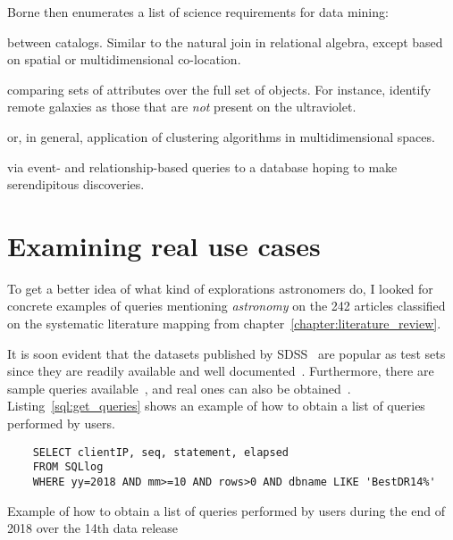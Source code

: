 Borne then enumerates a list of science requirements for data mining:

\begin{description}[leftmargin=1cm, labelindent=0.5cm]
    \item[Object Cross-Identification] between catalogs. Similar to the natural join
        in relational algebra, except based on spatial or multidimensional co-location.
    \item[Object Cross-Correlation] comparing sets of attributes over the full set of objects.
        For instance, identify remote galaxies as those that are \emph{not} present on the ultraviolet.
    \item[Nearest-neighbor identification] or, in general, application of clustering algorithms in multidimensional spaces.
    \item[Systematic Data Exploration] via event- and relationship-based queries to a database
        hoping to make serendipitous discoveries.
\end{description}

\section{Examining real use cases}

To get a better idea of what kind of explorations astronomers do, I looked for
concrete examples of queries mentioning \emph{astronomy} on the 242 articles classified on
the systematic literature mapping from chapter~\ref{chapter:literature_review}.

It is soon evident that the datasets published by \gls{SDSS}~\cite{SDSS14} are popular as test
sets since they are readily available and well documented~\cite{Gray2002}.
Furthermore, there are sample queries available~\cite{SDSSSamples}, and real ones can also be
obtained~\cite{SDSSSqlLogs}. Listing~\ref{sql:get_queries} shows an example of how to obtain a list
of queries performed by users.

\begin{listing}[htbp]
\begin{verbatim}
    SELECT clientIP, seq, statement, elapsed
    FROM SQLlog
    WHERE yy=2018 AND mm>=10 AND rows>0 AND dbname LIKE 'BestDR14%'
\end{verbatim}
\caption{Example of how to obtain a list of queries performed by users during the end of 2018 over the 14th data release}\label{sql:get_queries}
\end{listing}

